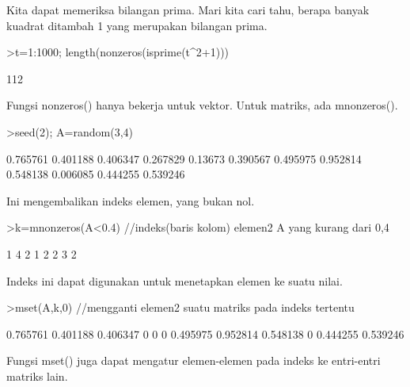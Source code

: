 \documentclass[a4paper,10pt]{article}
\begin{document}
\begin{eulernotebook}
\begin{eulercomment}
Kita dapat memeriksa bilangan prima. Mari kita cari tahu, berapa
banyak kuadrat ditambah 1 yang merupakan bilangan prima.
\end{eulercomment}
\begin{eulerprompt}
>t=1:1000; length(nonzeros(isprime(t^2+1)))
\end{eulerprompt}
\begin{euleroutput}
  112
\end{euleroutput}
\begin{eulercomment}
Fungsi nonzeros() hanya bekerja untuk vektor. Untuk matriks, ada
mnonzeros().
\end{eulercomment}
\begin{eulerprompt}
>seed(2); A=random(3,4)
\end{eulerprompt}
\begin{euleroutput}
       0.765761      0.401188      0.406347      0.267829 
        0.13673      0.390567      0.495975      0.952814 
       0.548138      0.006085      0.444255      0.539246 
\end{euleroutput}
\begin{eulercomment}
Ini mengembalikan indeks elemen, yang bukan nol.
\end{eulercomment}
\begin{eulerprompt}
>k=mnonzeros(A<0.4) //indeks(baris kolom) elemen2 A yang kurang dari 0,4
\end{eulerprompt}
\begin{euleroutput}
              1             4 
              2             1 
              2             2 
              3             2 
\end{euleroutput}
\begin{eulercomment}
Indeks ini dapat digunakan untuk menetapkan elemen ke suatu nilai.
\end{eulercomment}
\begin{eulerprompt}
>mset(A,k,0) //mengganti elemen2 suatu matriks pada indeks tertentu
\end{eulerprompt}
\begin{euleroutput}
       0.765761      0.401188      0.406347             0 
              0             0      0.495975      0.952814 
       0.548138             0      0.444255      0.539246 
\end{euleroutput}
\begin{eulercomment}
Fungsi mset() juga dapat mengatur elemen-elemen pada indeks ke
entri-entri matriks lain.
\end{eulercomment}
\begin{eulerprompt}

\end{eulerprompt}
\end{eulernotebook}
\end{document}
